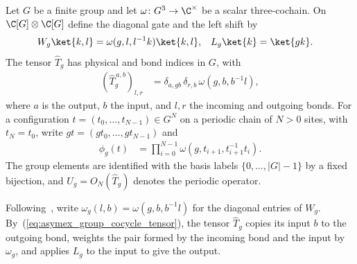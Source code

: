\begin{definition}
    \label{def:asymex_group_cocycle_tensor}
    \leanok
    Let $G$ be a finite group and let
    $\omega\colon G^3\to\C^\times$ be a scalar three-cochain. On
    $\C[G]\otimes\C[G]$ define the diagonal gate and the left shift by
    \begin{align}
        W_g\ket{k,l} & =\omega(g,l,l^{-1}k)\ket{k,l}, &
        L_g\ket{k}   & =\ket{gk}.
        \notag
    \end{align}
    The tensor $\hat T_g$ has physical and bond indices in $G$, with
    \begin{align}
        (\hat T_g^{\,a,b})_{l,r}
         & =\delta_{a,gb}\,\delta_{r,b}\,\omega(g,b,b^{-1}l),
        \label{eq:asymex_group_cocycle_tensor}
    \end{align}
    where $a$ is the output, $b$ the input, and $l,r$ the incoming and
    outgoing bonds. For a configuration $t=(t_0,\ldots,t_{N-1})\in G^N$
    on a periodic chain of $N>0$ sites, with $t_N=t_0$, write
    $gt=(gt_0,\ldots,gt_{N-1})$ and
    \begin{align}
        \phi_g(t)
         & =\prod_{i=0}^{N-1}\omega(g,t_{i+1},t_{i+1}^{-1}t_i).
        \label{eq:asymex_group_cocycle_phase}
    \end{align}
    The group elements are identified with the basis labels
    $\{0,\ldots,|G|-1\}$ by a fixed bijection, and $U_g=O_N(\hat T_g)$
    denotes the periodic operator.
\end{definition}

Following~\cite{GarreRubio2023MPOSym}, write
$\omega_g(l,b)=\omega(g,b,b^{-1}l)$ for the diagonal entries of $W_g$.
By~(\ref{eq:asymex_group_cocycle_tensor}), the tensor $\hat T_g$ copies its
input $b$ to the outgoing bond, weights the pair formed by the incoming
bond and the input by $\omega_g$, and applies $L_g$ to the input to give
the output.

